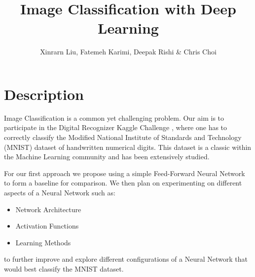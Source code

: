 \documentclass{article}
\begin{document}
\title{Image Classification with Deep Learning}
\author{
    Xinrarn Liu,
    Fatemeh Karimi,
    Deepak Rishi \&
    Chris Choi
}
\maketitle


\section*{Description}
Image Classification is a common yet challenging problem. Our aim is to participate in the Digital Recognizer Kaggle Challenge \cite{DigitalRecognizerKaggle}, where one has to correctly classify the Modified National Institute of Standards and Technology (MNIST) dataset of handwritten numerical digits. This dataset is a classic within the Machine Learning community and has been extensively studied.

For our first approach we propose using a simple Feed-Forward Neural Network to form a baseline for comparison. We then plan on experimenting on different aspects of a Neural Network such as:

\begin{itemize}
    \item{Network Architecture}
    \item{Activation Functions}
    \item{Learning Methods}
\end{itemize}

to further improve and explore different configurations of a Neural Network that would best classify the MNIST dataset.


{}

\end{document}
